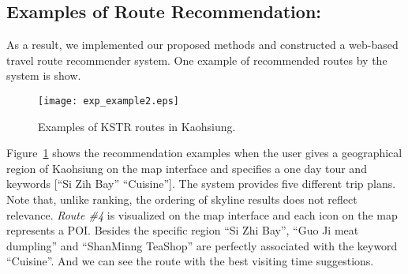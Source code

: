 \subsection{Examples of Route Recommendation: }
As a result, we implemented our proposed methods and constructed a web-based travel route recommender system. One example of recommended routes by the system is show.
\vspace{-1.5mm}

\begin{figure}[h]
\centering
\texttt{[image: exp\_example2.eps]}
\vspace{-7mm}
\caption{Examples of KSTR routes in Kaohsiung.}
\label{fig:example1} %
\end{figure}

\vspace{-1.5mm}

Figure~\ref{fig:example1} shows the recommendation examples when the user gives a geographical region of Kaohsiung on the map interface and specifies a one day tour and  keywords [``Si Zih Bay'' ``Cuisine'']. The system provides five different trip plans. Note that, unlike ranking, the ordering of skyline results does not reflect relevance. \textit{Route \#4} is visualized on the map interface and each icon on the map represents a POI. Besides the specific region ``Si Zhi Bay'', ``Guo Ji meat dumpling'' and ``ShanMinng TeaShop'' are perfectly associated with the keyword ``Cuisine''. And we can see the route with the best visiting time suggestions.

\vspace{-3mm}